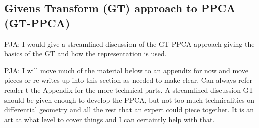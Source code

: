 \documentclass{article}
\newcommand{\commentPJA}[1]{{\textcolor{commentPJA_color}{PJA: #1}}}
\begin{document}
\subsection{Givens Transform (GT) approach to PPCA (GT-PPCA)} \label{Givens}

\commentPJA{I would give a streamlined discussion of the GT-PPCA approach giving the basics of the GT and how the representation is used.}


\commentPJA{I will move much of the material below to an appendix for now and move pieces or re-writes up into this section as needed to make clear.  Can always refer reader t the Appendix for the more technical parts.  A streamlined discussion GT should be given enough to develop the PPCA, but not too much technicalities on differential geometry and all the rest that an expert could piece together.  It is an art at what level to cover things and I can certaintly help with that.  }
\end{document}
